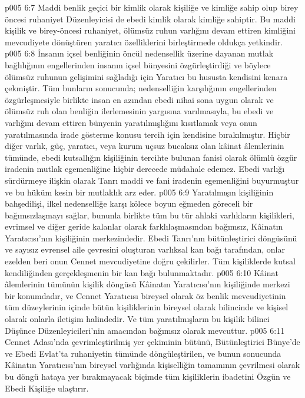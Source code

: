 \vs p005 6:7 Maddi benlik geçici bir kimlik olarak kişiliğe ve kimliğe sahip olup birey öncesi ruhaniyet Düzenleyicisi de ebedi kimlik olarak kimliğe sahiptir. Bu maddi kişilik ve birey\hyp{}öncesi ruhaniyet, ölümsüz ruhun varlığını devam ettiren kimliğini mevcudiyete dönüştüren yaratıcı özelliklerini birleştirmede oldukça yetkindir.
\vs p005 6:8 İnsanın içsel benliğinin öncül nedensellik üzerine dayanan mutlak bağlılığının engellerinden insanın içsel bünyesini özgürleştirdiği ve böylece ölümsüz ruhunun gelişimini sağladığı için Yaratıcı bu hususta kendisini kenara çekmiştir. Tüm bunların sonucunda; nedenselliğin karşılığının engellerinden özgürleşmesiyle birlikte insan en azından ebedi nihai sona uygun olarak ve ölümsüz ruh olan benliğin ilerlemesinin yargısına varılmasıyla, bu ebedi ve varlığını devam ettiren bünyenin yaratılmışlığını kısıtlamak veya onun yaratılmasında irade gösterme konusu tercih için kendisine bırakılmıştır. Hiçbir diğer varlık, güç, yaratıcı, veya kurum uçsuz bucaksız olan kâinat âlemlerinin tümünde, ebedi kutsallığın kişiliğinin tercihte bulunan fanisi olarak ölümlü özgür iradenin mutlak egemenliğine hiçbir derecede müdahale edemez. Ebedi varlığı sürdürmeye ilişkin olarak Tanrı maddi ve fani iradenin egemenliğini buyurmuştur ve bu hüküm kesin bir mutlaklık arz eder.
\vs p005 6:9 Yaratılmışın kişiliğinin bahşedilişi, ilkel nedenselliğe karşı kölece boyun eğmeden göreceli bir bağımsızlaşmayı sağlar, bununla birlikte tüm bu tür ahlaki varlıkların kişilikleri, evrimsel ve diğer geride kalanlar olarak farklılaşmasından bağımsız, Kâinatın Yaratıcısı’nın kişiliğinin merkezindedir. Ebedi Tanrı’nın bütünleştirici döngüsünü ve sayısız evrensel aile çevresini oluşturan varlıksal kan bağı tarafından, onlar ezelden beri onun Cennet mevcudiyetine doğru çekilirler. Tüm kişiliklerde kutsal kendiliğinden gerçekleşmenin bir kan bağı bulunmaktadır.
\vs p005 6:10 Kâinat âlemlerinin tümünün kişilik döngüsü Kâinatın Yaratıcısı’nın kişiliğinde merkezi bir konumdadır, ve Cennet Yaratıcısı bireysel olarak öz benlik mevcudiyetinin tüm düzeylerinin içinde bütün kişiliklerinin bireysel olarak bilincinde ve kişisel olarak onlarla iletişim halindedir. Ve tüm yaratılmışların bu kişilik bilinci Düşünce Düzenleyicileri’nin amacından bağımsız olarak mevcuttur.
\vs p005 6:11 Cennet Adası’nda çevrimleştirilmiş yer çekiminin bütünü, Bütünleştirici Bünye’de ve Ebedi Evlat’ta ruhaniyetin tümünde döngüleştirilen, ve bunun sonucunda Kâinatın Yaratıcısı’nın bireysel varlığında kişiselliğin tamamının çevrilmesi olarak bu döngü hataya yer bırakmayacak biçimde tüm kişiliklerin ibadetini Özgün ve Ebedi Kişiliğe ulaştırır.
